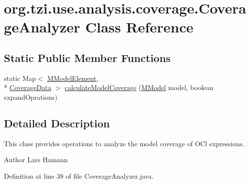 \hypertarget{classorg_1_1tzi_1_1use_1_1analysis_1_1coverage_1_1_coverage_analyzer}{\section{org.\-tzi.\-use.\-analysis.\-coverage.\-Coverage\-Analyzer Class Reference}
\label{classorg_1_1tzi_1_1use_1_1analysis_1_1coverage_1_1_coverage_analyzer}
}
\subsection*{Static Public Member Functions}
\begin{DoxyCompactItemize}
\item 
static Map$<$ \hyperlink{interfaceorg_1_1tzi_1_1use_1_1uml_1_1mm_1_1_m_model_element}{M\-Model\-Element}, \\*
\hyperlink{classorg_1_1tzi_1_1use_1_1analysis_1_1coverage_1_1_coverage_data}{Coverage\-Data} $>$ \hyperlink{classorg_1_1tzi_1_1use_1_1analysis_1_1coverage_1_1_coverage_analyzer_ab9598f2c47e980849e0374eae1c3dc8c}{calculate\-Model\-Coverage} (\hyperlink{classorg_1_1tzi_1_1use_1_1uml_1_1mm_1_1_m_model}{M\-Model} model, boolean expand\-Oprations)
\end{DoxyCompactItemize}


\subsection{Detailed Description}
This class provides operations to analyze the model coverage of O\-Cl expressions. \begin{DoxyAuthor}{Author}
Lars Hamann 
\end{DoxyAuthor}


Definition at line 38 of file Coverage\-Analyzer.\-java.



